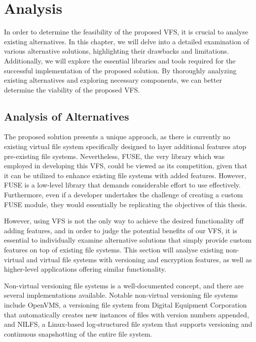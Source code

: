 \chapter{Analysis}
\label{chap:analysis}

In order to determine the feasibility of the proposed VFS, it is crucial to analyse existing alternatives.
In this chapter, we will delve into a detailed examination of various alternative solutions, highlighting their drawbacks and limitations.
Additionally, we will explore the essential libraries and tools required for the successful implementation of the proposed solution.
By thoroughly analyzing existing alternatives and exploring necessary components, we can better determine the viability of the proposed VFS\@.


\section{Analysis of Alternatives}\label{sec:alternatives}

The proposed solution presents a unique approach, as there is currently no existing virtual file system specifically designed to layer additional features atop pre-existing file systems.
Nevertheless, FUSE, the very library which was employed in developing this VFS, could be viewed as its competition, given that it can be utilized to enhance existing file systems with added features.
However, FUSE is a low-level library that demands considerable effort to use effectively.
Furthermore, even if a developer undertakes the challenge of creating a custom FUSE module, they would essentially be replicating the objectives of this thesis.

However, using VFS is not the only way to achieve the desired functionality off adding features, and in order to judge the potential benefits of our VFS, it is essential to individually examine alternative solutions that simply provide custom features on top of existing file systems.
This section will analyse existing non-virtual and virtual file systems with versioning and encryption features, as well as higher-level applications offering similar functionality.

Non-virtual versioning file systems is a well-documented concept, and there are several implementations available.
Notable non-virtual versioning file systems include OpenVMS, a versioning file system from Digital Equipment Corporation that automatically creates new instances of files with version numbers appended, and NILFS, a Linux-based log-structured file system that supports versioning and continuous snapshotting of the entire file system.

